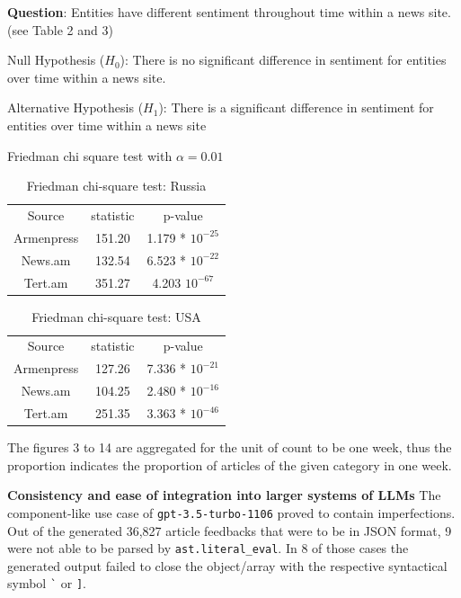 \documentclass{IEEEtran}
\begin{document}
\vspace{0.5cm}

\textbf{Question}: Entities have different sentiment throughout time within a news site. (see Table 2 and 3)

Null Hypothesis ($H_0$): There is no significant difference in sentiment for entities over time within a news site.  

Alternative Hypothesis ($H_1$): There is a significant difference in sentiment for entities over time within a news site  

Friedman chi square test with $\alpha = 0.01$


\begin{table}
    \centering
    \begin{tabular}{ccc}
        Source & statistic & p-value \\
        Armenpress & 151.20 & 1.179 * $10^{-25}$ \\
        News.am & 132.54 & 6.523 * $10^{-22}$ \\
        Tert.am & 351.27 & 4.203 $10^{-67}$ \\
    \end{tabular}
    \caption{Friedman chi-square test: Russia}
    \label{tab:friedman_russia}
\end{table}

\begin{table}
    \centering
    \begin{tabular}{ccc}
        Source & statistic & p-value \\
        Armenpress & 127.26 & 7.336 * $10^{-21}$ \\
        News.am & 104.25 & 2.480 * $10^{-16}$ \\
        Tert.am & 251.35 & 3.363 * $10^{-46}$ \\
    \end{tabular}
    \caption{Friedman chi-square test: USA}
    \label{tab:friedman_usa}
\end{table}

The figures 3 to 14 are aggregated for the unit of count to be one week, thus the proportion indicates the proportion of articles of the given category in one week.

\vspace{1.4cm}
\textbf{Consistency and ease of integration into larger systems of LLMs}
The component-like use case of \verb|gpt-3.5-turbo-1106| proved to contain imperfections. Out of the generated 36,827 article feedbacks that were to be in JSON format, 9 were not able to be parsed by \verb|ast.literal_eval|. In 8 of those cases the generated output failed to close the object/array with the respective syntactical symbol \verb|`| or \verb|]|.
\vspace{0.4cm}

\end{document}
